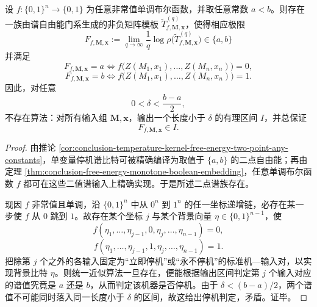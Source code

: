 \begin{theorem}[任意非常值单调停机公式的高精度近似不可判定]\label{thm:conclusion-free-energy-monotone-halting-formula-nonapproximable}
设 \(f:\{0,1\}^n\to\{0,1\}\) 为任意非常值单调布尔函数，并取任意常数 \(a<b\)。则存在一族由谱自由能门系生成的非负矩阵模板 \(\widetilde T^{(q)}_{f,\mathbf M,\mathbf x}\)，使得相应极限
\[
F_{f,\mathbf M,\mathbf x}
:=
\lim_{q\to\infty}\frac1q\log\rho\!\bigl(\widetilde T^{(q)}_{f,\mathbf M,\mathbf x}\bigr)
\in\{a,b\}
\]
并满足
\[
F_{f,\mathbf M,\mathbf x}=a
\iff
f\bigl(Z(M_1,x_1),\dots,Z(M_n,x_n)\bigr)=0,
\]
\[
F_{f,\mathbf M,\mathbf x}=b
\iff
f\bigl(Z(M_1,x_1),\dots,Z(M_n,x_n)\bigr)=1.
\]
因此，对任意
\[
0<\delta<\frac{b-a}{2},
\]
不存在算法：对所有输入组 \(\mathbf M,\mathbf x\)，输出一个长度小于 \(\delta\) 的有理区间 \(I\)，并总保证
\[
F_{f,\mathbf M,\mathbf x}\in I.
\]
\end{theorem}
\begin{proof}
由推论 \ref{cor:conclusion-temperature-kernel-free-energy-two-point-any-constants}，单变量停机谱比特可被精确编译为取值于 \(\{a,b\}\) 的二点自由能；再由定理 \ref{thm:conclusion-free-energy-monotone-boolean-embedding}，任意单调布尔函数 \(f\) 都可在这些二值谱输入上精确实现。于是所述二点谱族存在。

现因 \(f\) 非常值且单调，沿 \(\{0,1\}^n\) 中从 \(0^n\) 到 \(1^n\) 的任一坐标递增链，必存在某一步使 \(f\) 从 \(0\) 跳到 \(1\)。故存在某个坐标 \(j\) 与某个背景向量 \(\eta\in\{0,1\}^{n-1}\)，使
\[
f(\eta_1,\dots,\eta_{j-1},0,\eta_j,\dots,\eta_{n-1})=0,
\]
\[
f(\eta_1,\dots,\eta_{j-1},1,\eta_j,\dots,\eta_{n-1})=1.
\]
把除第 \(j\) 个之外的各输入固定为“立即停机”或“永不停机”的标准机—输入对，以实现背景比特 \(\eta\)。则统一近似算法一旦存在，便能根据输出区间判定第 \(j\) 个输入对应的谱值究竟是 \(a\) 还是 \(b\)，从而判定该机器是否停机。由于 \(\delta<(b-a)/2\)，两个谱值不可能同时落入同一长度小于 \(\delta\) 的区间，故这给出停机判定，矛盾。证毕。
\end{proof}

